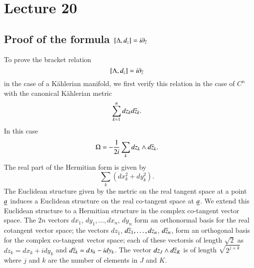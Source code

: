 \chapter{Lecture 20}

\section*{Proof of the formula
  $[\Delta,d_{z}]=i\partial_{\overline{z}}$}\pageoriginale 

To prove the bracket relation
$$
[\Lambda,d_{z}]=i\partial_{\overline{z}}
$$
in the case of a K\"ahlerian manifold, we first verify this relation
in the case of $C^{n}$ with the canonical K\"ahlerian metric
$$
\sum^{n}_{k=1}dz_{k}d\overline{z}_{k}.
$$
In this case
$$
\Omega=-\frac{1}{2i}\sum_{k}dz_{k}\wedge d\overline{z}_{k}.
$$
The real part of the Hermitian form is given by
$$
\sum_{k}(dx^{2}_{k}+dy^{2}_{k}).
$$
The Euclidean structure given by the metric on the real tangent space
at a point $\underline{a}$ induces a Euclidean structure on the real
co-tangent space at $\underline{a}$. We extend this Euclidean structure to a
Hermitian structure in the complex co-tangent vector space. The $2n$
vectors $dx_{1}$, $dy_{1},\ldots,dx_{n}$, $dy_{n}$ form an orthonormal
basis for the real cotangent vector space; the vectors $dz_{1}$,
$d\overline{z}_{1},\ldots,dz_{n}$, $d\overline{z}_{n}$, form an orthogonal basis
for the complex co-tangent vector space; each of these
vectors\pageoriginale is of length $\sqrt{2}$ as
$dz_{k}=dx_{k}+idy_{k}$ and $d\overline{z}_{k}=dx_{k}-idy_{k}$. The vector
$dz_{J}\wedge d\overline{z}_{K}$ is of length $\sqrt{2^{j+k}}$ where $j$ and
$k$ are the number of elements in $J$ and $K$.


